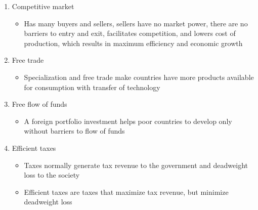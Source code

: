 \documentclass[12pt]{article}
\begin{document}
\begin{enumerate}
\begin{enumerate}
\begin{enumerate}
\begin{enumerate}
\begin{itemize}
                    \end{itemize}

                  \item Competitive market

                    \begin{itemize}

                      \item Has many buyers and sellers, sellers have no market power, there are no barriers to entry and exit, facilitates competition, and lowers cost of production, which results in maximum efficiency and economic growth

                    \end{itemize}

                  \item Free trade

                    \begin{itemize}

                      \item Specialization and free trade make countries have more products available for consumption with transfer of technology

                    \end{itemize}

                  \item Free flow of funds

                    \begin{itemize}

                      \item A foreign portfolio investment helps poor countries to develop only without barriers to flow of funds

                    \end{itemize}

                  \item Efficient taxes
                    
                    \begin{itemize}

                      \item Taxes normally generate tax revenue to the government and deadweight loss to the society

                      \item Efficient taxes are taxes that maximize tax revenue, but minimize deadweight loss

                    \end{itemize}


\end{enumerate}
\end{enumerate}
\end{enumerate}
\end{enumerate}
\end{document}
